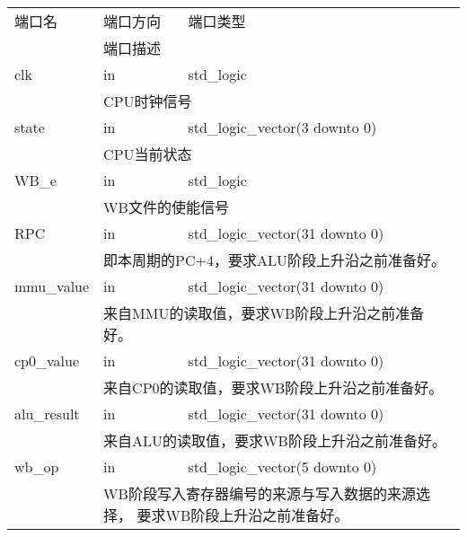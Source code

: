         \begin{tabularx}{\textwidth}{lll}
            \toprule
            端口名          & 端口方向  & 端口类型 \\
            \cmidrule(l){2-3}
            &
            \multicolumn{2}{X}{端口描述} \\
            \midrule
            clk             & in        & std\_logic \\
            \cmidrule(l){2-3}
            &
            \multicolumn{2}{X}{
                CPU时钟信号
            } \\
            \midrule
            state           & in        & std\_logic\_vector(3 downto 0) \\
            \cmidrule(l){2-3}
            &
            \multicolumn{2}{X}{
                CPU当前状态
            } \\
            WB\_e           & in        & std\_logic \\
            \cmidrule(l){2-3}
            &
            \multicolumn{2}{X}{
                WB文件的使能信号
            } \\
            \midrule
            RPC             & in        & std\_logic\_vector(31 downto 0) \\
            \cmidrule(l){2-3}
            &
            \multicolumn{2}{X}{
                即本周期的PC+4，要求ALU阶段上升沿之前准备好。
            } \\
            \midrule
            mmu\_value      & in        & std\_logic\_vector(31 downto 0) \\
            \cmidrule(l){2-3}
            &
            \multicolumn{2}{X}{
                来自MMU的读取值，要求WB阶段上升沿之前准备好。
            } \\
            \midrule
            cp0\_value      & in        & std\_logic\_vector(31 downto 0) \\
            \cmidrule(l){2-3}
            &
            \multicolumn{2}{X}{
                来自CP0的读取值，要求WB阶段上升沿之前准备好。
            } \\
            \midrule
            alu\_result     & in        & std\_logic\_vector(31 downto 0) \\
            \cmidrule(l){2-3}
            &
            \multicolumn{2}{X}{
                来自ALU的读取值，要求WB阶段上升沿之前准备好。
            } \\
            \midrule
            wb\_op          & in        & std\_logic\_vector(5 downto 0) \\
            \cmidrule(l){2-3}
            &
            \multicolumn{2}{X}{
                WB阶段写入寄存器编号的来源与写入数据的来源选择，%
                要求WB阶段上升沿之前准备好。

}
\end{tabularx}
